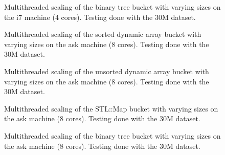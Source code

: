 \begin{landscape}
\begin{figure}[H]
{    }
    \label{fig:ts_i7_30m_btree}
    \caption{Multithreaded scaling of the binary tree bucket with varying sizes on the
    i7 machine (4 cores). Testing done with the 30M dataset.}
\end{figure}
\begin{figure}[H]
    \label{fig:ts_ask_30m_sorted}
    \caption{Multithreaded scaling of the sorted dynamic array bucket with varying sizes on the
    ask machine (8 cores). Testing done with the 30M dataset.}
\end{figure}
\begin{figure}[H]
    \label{fig:ts_ask_30m_unsorted}
    \caption{Multithreaded scaling of the unsorted dynamic array bucket with varying sizes on the
    ask machine (8 cores). Testing done with the 30M dataset.}
\end{figure}
\begin{figure}[H]
    \label{fig:ts_ask_30m_map}
    \caption{Multithreaded scaling of the STL::Map bucket with varying sizes on the
    ask machine (8 cores). Testing done with the 30M dataset.}
\end{figure}
\begin{figure}[H]
    \label{fig:ts_ask_30m_btree}
    \caption{Multithreaded scaling of the binary tree bucket with varying sizes on the
    ask machine (8 cores). Testing done with the 30M dataset.}
\end{figure}
\begin{figure}[H]
\end{figure}
\end{landscape}
